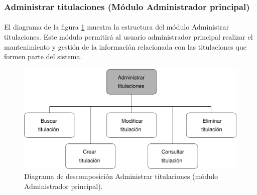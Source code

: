 \subsubsection{Administrar titulaciones (Módulo Administrador principal)}

  \paragraph{}El diagrama de la figura
  \ref{diagramaDescomposicionAdministrarTitulaciones} muestra la estructura del
  módulo Administrar titulaciones. Este módulo permitirá al usuario
  administrador principal realizar el mantenimiento y gestión de la información
  relacionada con las titulaciones que formen parte del sistema.


  \begin{figure}[!ht]
    \begin{center}
      \includegraphics[]{11.Disenyo_Arquitectonico/11.2.Diagramas_Descomposicion/11.2.2.Modulo_administrador_principal/AdministrarBBDD/AdministrarTitulaciones/Diagramas/administrar_titulaciones.pdf}
      \caption{Diagrama de descomposición Administrar titulaciones (módulo Administrador principal).}
      \label{diagramaDescomposicionAdministrarTitulaciones}
    \end{center}
  \end{figure}

